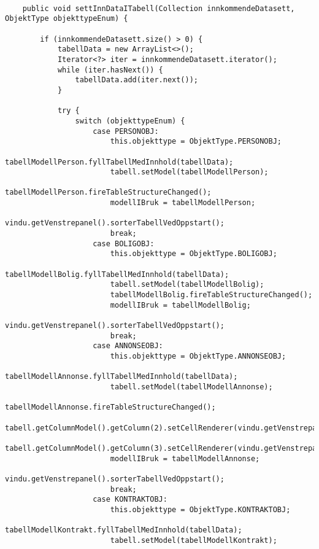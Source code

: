 \begin{lstlisting}[caption=Metoden \texttt{settInnDataITabell} i \texttt{ControllerTabell.java}]

    public void settInnDataITabell(Collection innkommendeDatasett, ObjektType objekttypeEnum) {

        if (innkommendeDatasett.size() > 0) {
            tabellData = new ArrayList<>();
            Iterator<?> iter = innkommendeDatasett.iterator();
            while (iter.hasNext()) {
                tabellData.add(iter.next());
            }

            try {
                switch (objekttypeEnum) {
                    case PERSONOBJ:
                        this.objekttype = ObjektType.PERSONOBJ;
                        tabellModellPerson.fyllTabellMedInnhold(tabellData);
                        tabell.setModel(tabellModellPerson);
                        tabellModellPerson.fireTableStructureChanged();
                        modellIBruk = tabellModellPerson;
                        vindu.getVenstrepanel().sorterTabellVedOppstart();
                        break;
                    case BOLIGOBJ:
                        this.objekttype = ObjektType.BOLIGOBJ;
                        tabellModellBolig.fyllTabellMedInnhold(tabellData);
                        tabell.setModel(tabellModellBolig);
                        tabellModellBolig.fireTableStructureChanged();
                        modellIBruk = tabellModellBolig;
                        vindu.getVenstrepanel().sorterTabellVedOppstart();
                        break;
                    case ANNONSEOBJ:
                        this.objekttype = ObjektType.ANNONSEOBJ;
                        tabellModellAnnonse.fyllTabellMedInnhold(tabellData);
                        tabell.setModel(tabellModellAnnonse);
                        tabellModellAnnonse.fireTableStructureChanged();
                        tabell.getColumnModel().getColumn(2).setCellRenderer(vindu.getVenstrepanel().settHoyrestilltFormateringPaaTabell());
                        tabell.getColumnModel().getColumn(3).setCellRenderer(vindu.getVenstrepanel().settHoyrestilltFormateringPaaTabell());
                        modellIBruk = tabellModellAnnonse;
                        vindu.getVenstrepanel().sorterTabellVedOppstart();
                        break;
                    case KONTRAKTOBJ:
                        this.objekttype = ObjektType.KONTRAKTOBJ;
                        tabellModellKontrakt.fyllTabellMedInnhold(tabellData);
                        tabell.setModel(tabellModellKontrakt);

\end{lstlisting}
